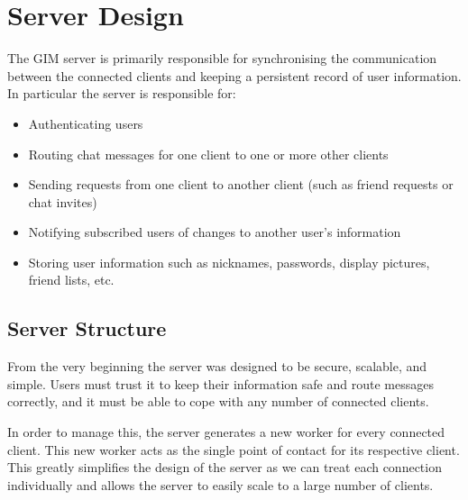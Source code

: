 \section{Server Design}
\label{ServerDesign}

The GIM server is primarily responsible for synchronising the communication between the connected clients and keeping a persistent record of user information. In particular the server is responsible for:

\begin{itemize}
    \item{Authenticating users}
    \item{Routing chat messages for one client to one or more other clients}
    \item{Sending requests from one client to another client (such as friend requests or chat invites)}
    \item{Notifying subscribed users of changes to another user's information}
    \item{Storing user information such as nicknames, passwords, display pictures, friend lists, etc.}
\end{itemize}


\subsection{Server Structure}

From the very beginning the server was designed to be secure, scalable, and simple. Users must trust it to keep their information safe and route messages correctly, and it must be able to cope with any number of connected clients.

In order to manage this, the server generates a new worker for every connected client. This new worker acts as the single point of contact for its respective client. This greatly simplifies the design of the server as we can treat each connection individually and allows the server to easily scale to a large number of clients.


